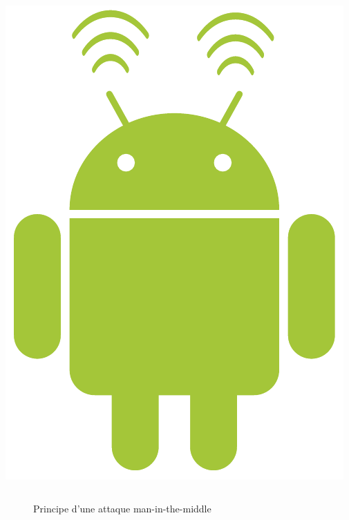 \documentclass[aspectratio=1610, ]{beamer}%
\begin{document}
\begin{frame}[t]
\begin{columns}
\begin{column}{0.25\linewidth}
      \includegraphics[width=0.75\linewidth]{img/android_network.pdf}
    \end{column}
  \end{columns}
  \vfill
\end{frame}

\begin{frame}[t]
  \slidetitle[Principe]
  \begin{figure}
    \vspace{-0.65cm}
    
    \caption{Principe d'une attaque man-in-the-middle}
  \end{figure}
\end{frame}
\end{document}

